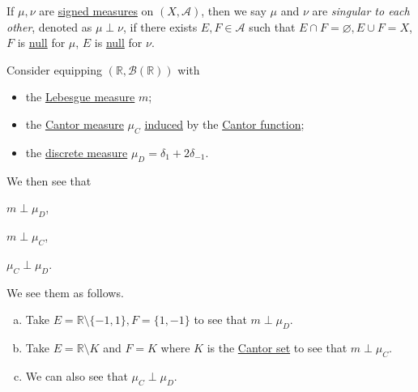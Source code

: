 \begin{definition}[Singular]\label{def:singular}
	If \(\mu,\nu\) are \hyperref[def:signed-measure]{signed measures} on \((X, \mathcal{A})\), then we say \(\mu\) and \(\nu \) are \emph{singular to each other}, denoted as \(\mu \perp \nu\), if there exists \(E,F \in \mathcal{A}\) such that \(E \cap F = \varnothing, E \cup F = X\), \(F\) is \hyperref[def:null-set-signed-measure]{null} for \(\mu\), \(E\) is \hyperref[def:null-set-signed-measure]{null} for \(\nu\).
\end{definition}

\begin{eg}
	Consider equipping \((\mathbb{R}, \mathcal{B}(\mathbb{R}))\) with
	\begin{itemize}
		\item the \hyperref[def:Lebesgue-measure]{Lebesgue measure} \(m\);
		\item the \hyperref[def:Cantor-measure]{Cantor measure} \(\mu_C\) \hyperref[def:Lebesgue-Stieltjes-measure]{induced} by the \hyperref[sssec:Cantor-Function]{Cantor function};
		\item the \hyperref[eg:discrete-measure]{discrete measure} \(\mu_D = \delta_1 + 2\delta_{-1}\).
	\end{itemize}

	We then see that
	\begin{enumerate*}[(a)]
		\item \(m\perp \mu _D\),
		\item \(m\perp \mu _C\),
		\item \(\mu _C \perp \mu _D\).
	\end{enumerate*}
\end{eg}
\begin{explanation}
	We see them as follows.
	\begin{enumerate}[(a)]
		\item Take \(E = \mathbb{R} \setminus \{-1,1\}, F = \{1,-1\}\) to see that \(m \perp \mu_D\).
		\item Take \(E = \mathbb{R} \setminus K\) and \(F = K\) where \(K\) is the \hyperref[eg:lec8:Cantor-set]{Cantor set} to see that \(m \perp \mu_C\).
		\item We can also see that \(\mu_C \perp \mu_D\).
	\end{enumerate}
\end{explanation}

